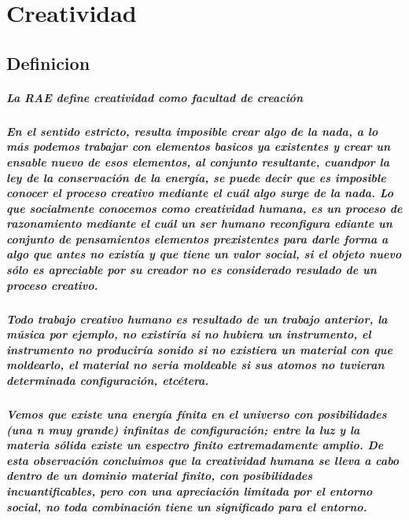\chapter{Creatividad}
\section{Definicion}
\paragraph{La RAE define creatividad como {\it facultad de creación}}

\paragraph{En el sentido estricto, resulta imposible crear algo de la nada, a lo más podemos trabajar con elementos basicos ya existentes y crear un ensable nuevo de esos elementos, al conjunto resultante, cuandpor la ley de la conservación de la energía, se puede decir que es imposible conocer el proceso creativo mediante el cuál algo surge de la nada. Lo que socialmente conocemos como creatividad humana, es un proceso de razonamiento mediante el cuál un ser humano reconfigura ediante un conjunto de pensamientos elementos prexistentes para darle forma a algo que antes no existía y que tiene un valor social, si el objeto nuevo sólo es apreciable por su creador no es considerado resulado de un proceso creativo.}

\paragraph{Todo trabajo creativo humano es resultado de un trabajo anterior, la música por ejemplo, no existiría si no hubiera un instrumento, el instrumento no produciría sonido si no existiera un material con que moldearlo, el material no seria moldeable si sus atomos no tuvieran determinada configuración, etcétera.}

\paragraph{Vemos que existe una energía fínita en el universo con posibilidades (una n muy grande) infinitas de configuración; entre la luz y la materia sólida existe un espectro finito extremadamente amplio. De esta observación concluimos que la creatividad humana se lleva a cabo dentro de un dominio material finito, con posibilidades incuantificables, pero con una apreciación limitada por el entorno social, no toda combinación tiene un significado para el entorno.}


